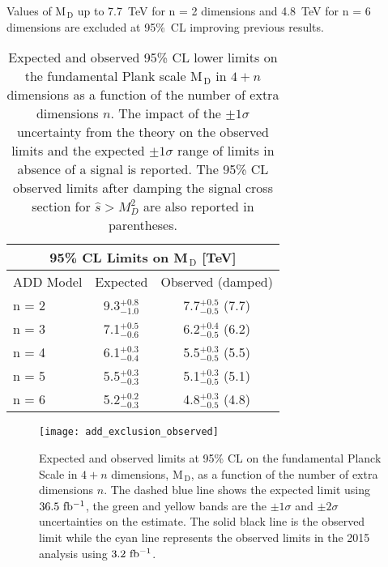Values of M$_\mathrm{\, D}$ up to 7.7~TeV for n = 2 dimensions and 4.8~TeV for n
= 6 dimensions are excluded at 95\%~CL improving previous results.
\begin{table}[!hb]
  \centering
  \begin{tabular}{lcc}
    \toprule
    \multicolumn{3}{c}{95\% CL Limits on M$_\mathrm{\, D}$
    [TeV]} \\
    \midrule \midrule
    ADD Model & Expected & Observed (damped) \\
    n = 2 & 9.3$^{+0.8}_{-1.0}$ & 7.7$^{+0.5}_{-0.5}$ (7.7) \B \\
    n = 3 & 7.1$^{+0.5}_{-0.6}$ & 6.2$^{+0.4}_{-0.5}$ (6.2) \T \B \\
    n = 4 & 6.1$^{+0.3}_{-0.4}$ & 5.5$^{+0.3}_{-0.5}$ (5.5) \T \B \\
    n = 5 & 5.5$^{+0.3}_{-0.3}$ & 5.1$^{+0.3}_{-0.5}$ (5.1) \T \B \\
    n = 6 & 5.2$^{+0.2}_{-0.3}$ & 4.8$^{+0.3}_{-0.5}$ (4.8) \T \\
    \bottomrule
  \end{tabular}
  \caption{Expected and observed 95\% CL lower limits on the fundamental Plank
      scale M$_\mathrm{\, D}$ in $4 + n$ dimensions as a function of the number
      of extra dimensions $n$. The impact of the $\pm 1 \sigma$ uncertainty from
      the theory on the observed limits and the expected $\pm 1 \sigma$ range of
      limits in absence of a signal is reported. The 95\% CL observed limits
      after damping the signal cross section for $\hat{s} > M_D^2$ are also
      reported in parentheses.}
  \label{tab:add_limits}
\end{table}
\begin{figure}
  \centering
  \texttt{[image: add\_exclusion\_observed]}
  \caption{Expected and observed limits at 95\% CL on the fundamental Planck
    Scale in $4 + n$ dimensions, M$_\mathrm{\, D}$, as a function of the number
    of extra dimensions $n$. The dashed blue line shows the expected limit using
    $36.5~\mbox{fb$^{-1}$}$, the green and yellow bands are the $\pm 1 \sigma$ and
    $\pm 2 \sigma$ uncertainties on the estimate. The solid black line is the
    observed limit while the cyan line represents the observed limits in the
    2015 analysis using $3.2~\mbox{fb$^{-1}$}$.}
  \label{fig:add_observed}
\end{figure}
